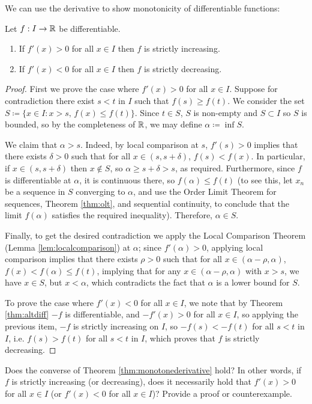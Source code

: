 \documentclass[../analysis1.tex]{subfiles}
\begin{document}
We can use the derivative to show monotonicity of differentiable functions:
\begin{theorem}
\label{thm:monotonederivative}
    \begin{shaded*}
        Let $f:I\to\mathbb{R}$ be differentiable.
        \begin{enumerate}
            \item[1.] If $f'(x)>0$ for all $x\in I$ then $f$ is strictly increasing.
            \item[2.] If $f'(x)<0$ for all $x\in I$ then $f$ is strictly decreasing. 
        \end{enumerate}
    \end{shaded*}
\end{theorem} 
\begin{proof}
    First we prove the case where $f'(x)>0$ for all $x\in I$. Suppose for contradiction there exist $s<t$ in $I$ such that $f(s)\ge f(t)$. We consider the set $S\coloneqq \{x\in I: x>s,\, f(x)\le f(t)\}$. Since $t\in S$, $S$ is non-empty and $S\subset I$ so $S$ is bounded, so by the completeness of $\mathbb{R}$, we may define $\alpha \coloneqq \inf S$.

    We claim that $\alpha>s$. Indeed, by local comparison at $s$, $f'(s)>0$ implies that there exists $\delta>0$ such that for all $x\in (s,s+\delta)$, $f(s)<f(x)$. In particular, if $x\in (s,s+\delta)$ then $x\notin S$, so $\alpha\ge s+\delta>s$, as required. Furthermore, since $f$ is differentiable at $\alpha$, it is continuous there, so $f(\alpha)\le f(t)$ (to see this, let $x_n$ be a sequence in $S$ converging to $\alpha$, and use the Order Limit Theorem for sequences, Theorem \ref{thm:olt}, and sequential continuity, to conclude that the limit $f(\alpha)$ satisfies the required inequality). Therefore, $\alpha\in S$.
    
    Finally, to get the desired contradiction we apply the Local Comparison Theorem (Lemma \ref{lem:localcomparison}) at $\alpha$; since $f'(\alpha)>0$, applying local comparison implies that there exists $\rho>0$ such that for all $x\in (\alpha-\rho,\alpha)$, $f(x)<f(\alpha)\le f(t)$, implying that for any $x\in (\alpha-\rho,\alpha)$ with $x>s$, we have $x\in S$, but $x<\alpha$, which contradicts the fact that $\alpha$ is a lower bound for $S$. 

    To prove the case where $f'(x)<0$ for all $x\in I$, we note that by Theorem \ref{thm:altdiff} $-f$ is differentiable, and $-f'(x)>0$ for all $x\in I$, so applying the previous item, $-f$ is strictly increasing on $I$, so $-f(s)<-f(t)$ for all $s<t$ in $I$, i.e. $f(s)>f(t)$ for all $s<t$ in $I$, which proves that $f$ is strictly decreasing.\qedhere
\end{proof}
\begin{exercise*}
    Does the converse of Theorem \ref{thm:monotonederivative} hold? In other words, if $f$ is strictly increasing (or decreasing), does it necessarily hold that $f'(x)>0$ for all $x\in I$ (or $f'(x)<0$ for all $x\in I$)? Provide a proof or counterexample.  
\end{exercise*}
\end{document}
